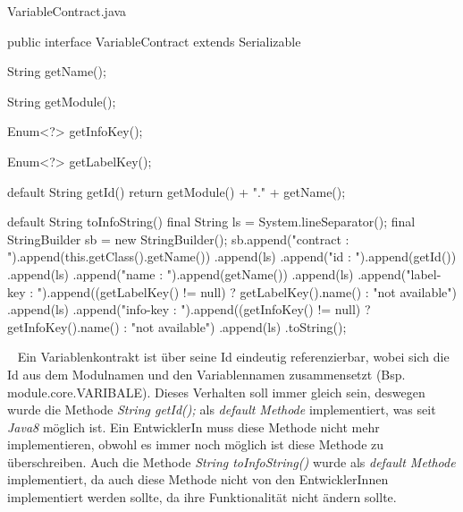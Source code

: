 \begin{program}[h]
\caption{VariableContract.java}
\label{prog:variableContract}
\begin{JavaCode}
public interface VariableContract extends Serializable {

    String getName();

    String getModule();

    Enum<?> getInfoKey();

    Enum<?> getLabelKey();

    default String getId() {      
		return getModule() + "." + getName();
    }

    default String toInfoString() {
        final String ls = System.lineSeparator();
        final StringBuilder sb = new StringBuilder();
        sb.append("contract  : ").append(this.getClass().getName())
          .append(ls)
          .append("id        : ").append(getId())
          .append(ls)
          .append("name      : ").append(getName())
          .append(ls)
          .append("label-key : ").append((getLabelKey() != null) 
                                          ? getLabelKey().name() 
                                          : "not available")
          .append(ls)
          .append("info-key  : ").append((getInfoKey() != null) 
                                          ? getInfoKey().name() 
                                          : "not available")
          .append(ls)
          .toString();
    }
}
\end{JavaCode}
\end{program}
\ \newline
Ein Variablenkontrakt ist über seine Id eindeutig referenzierbar, wobei sich die Id aus dem Modulnamen und den Variablennamen zusammensetzt (Bsp. module.core.VARIBALE).
Dieses Verhalten soll immer gleich sein, deswegen wurde die Methode \emph{String getId();} als \emph{default Methode} implementiert, was seit \emph{Java8} möglich ist. Ein EntwicklerIn muss diese Methode nicht mehr implementieren, obwohl es immer noch möglich ist diese Methode zu überschreiben. Auch die Methode \emph{String toInfoString()} wurde als \emph{default Methode} implementiert, da auch diese Methode nicht von den EntwicklerInnen implementiert werden sollte, da ihre Funktionalität nicht ändern sollte. 

